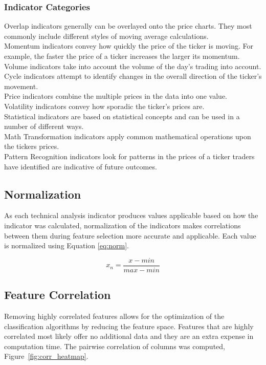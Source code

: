 \documentclass{article}\raggedbottom
\begin{document}
\subsubsection{Indicator Categories}
  Overlap indicators generally can be overlayed onto the price charts. They most commonly include different styles of moving average calculations.
\\Momentum indicators convey how quickly the price of the ticker is moving. For example, the faster the price of a ticker increases the larger its momentum.
\\Volume indicators take into account the volume of the day's trading into account. 
\\Cycle indicators attempt to identify changes in the overall direction of the ticker's movement.
\\Price indicators combine the multiple prices in the data into one value.
\\Volatility indicators convey how sporadic the ticker's prices are.
\\Statistical indicators are based on statistical concepts and can be used in a number of different ways.
\\Math Transformation indicators apply common mathematical operations upon the tickers prices.
\\Pattern Recognition indicators look for patterns in the prices of a ticker traders have identified are indicative of future outcomes.

\subsection{Normalization}
As each technical analysis indicator produces values applicable based on how the indicator was calculated, normalization of the indicators makes correlations between them during feature selection more accurate and applicable. Each value is normalized using Equation \eqref{eq:norm}.

\begin{equation}\label{eq:norm}
	x_n = \frac{x - min}{max - min}
\end{equation}

\subsection{Feature Correlation}
Removing highly correlated features allows for the optimization of the classification algorithms by reducing the feature space. Features that are highly correlated most likely offer no additional data and they are an extra expense in computation time. The pairwise correlation of columns was computed, Figure~\ref{fig:corr_heatmap}.
\end{document}
